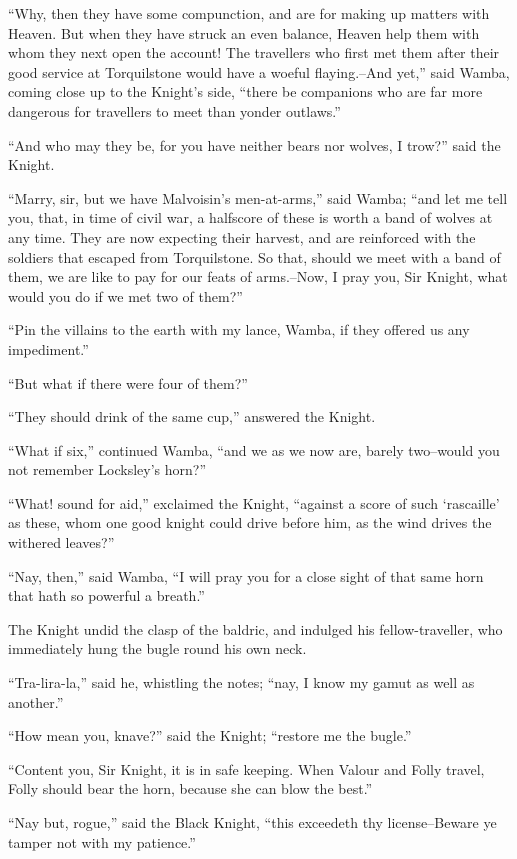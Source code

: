 ``Why, then they have some compunction, and are for making up matters
with Heaven. But when they have struck an even balance, Heaven help them
with whom they next open the account! The travellers who first met them
after their good service at Torquilstone would have a woeful
flaying.--And yet,'' said Wamba, coming close up to the Knight's side,
``there be companions who are far more dangerous for travellers to meet
than yonder outlaws.''

``And who may they be, for you have neither bears nor wolves, I trow?''
said the Knight.

``Marry, sir, but we have Malvoisin's men-at-arms,'' said Wamba; ``and
let me tell you, that, in time of civil war, a halfscore of these is
worth a band of wolves at any time. They are now expecting their
harvest, and are reinforced with the soldiers that escaped from
Torquilstone. So that, should we meet with a band of them, we are like
to pay for our feats of arms.--Now, I pray you, Sir Knight, what would
you do if we met two of them?''

``Pin the villains to the earth with my lance, Wamba, if they offered us
any impediment.''

``But what if there were four of them?''

``They should drink of the same cup,'' answered the Knight.

``What if six,'' continued Wamba, ``and we as we now are, barely
two--would you not remember Locksley's horn?''

``What! sound for aid,'' exclaimed the Knight, ``against a score of such
`rascaille' as these, whom one good knight could drive before him, as
the wind drives the withered leaves?''

``Nay, then,'' said Wamba, ``I will pray you for a close sight of that
same horn that hath so powerful a breath.''

The Knight undid the clasp of the baldric, and indulged his
fellow-traveller, who immediately hung the bugle round his own neck.

``Tra-lira-la,'' said he, whistling the notes; ``nay, I know my gamut as
well as another.''

``How mean you, knave?'' said the Knight; ``restore me the bugle.''

``Content you, Sir Knight, it is in safe keeping. When Valour and Folly
travel, Folly should bear the horn, because she can blow the best.''

``Nay but, rogue,'' said the Black Knight, ``this exceedeth thy
license--Beware ye tamper not with my patience.''


